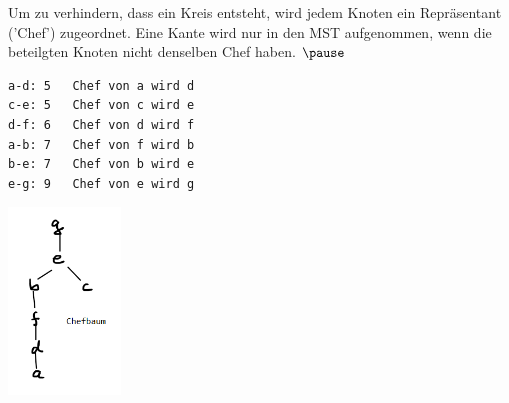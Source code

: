 \begin{frame}[fragile]
Um zu verhindern, dass ein Kreis entsteht, wird jedem Knoten ein Repräsentant ('Chef') zugeordnet.
Eine Kante wird nur in den MST aufgenommen, wenn die beteilgten Knoten nicht denselben Chef haben.
 $\pause$
\begin{minipage}[c]{6cm}
\begin{lstlisting}[basicstyle=\scriptsize]
a-d: 5   Chef von a wird d
c-e: 5   Chef von c wird e
d-f: 6   Chef von d wird f
a-b: 7   Chef von f wird b
b-e: 7   Chef von b wird e
e-g: 9   Chef von e wird g
\end{lstlisting}
\end{minipage}
\begin{minipage}[c]{5cm}
\includegraphics[width=3cm]{kruskal_03_chefbaum.png}
\end{minipage}
\end{frame}

